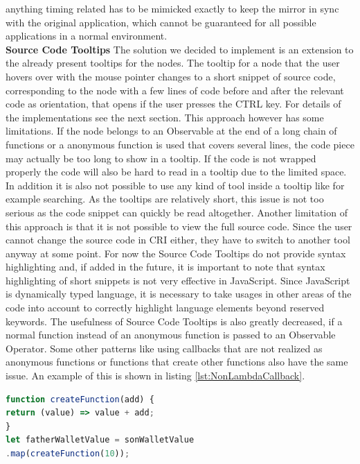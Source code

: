 anything timing related has to be mimicked exactly to keep the mirror in sync with the original application, which cannot be guaranteed for all possible applications in a normal environment. \\
\textbf{Source Code Tooltips}
The solution we decided to implement is an extension to the already present tooltips for the nodes. The tooltip for a node that the user hovers over with the mouse pointer changes to a short snippet of source code, corresponding to the node with a few lines of code before and after the relevant code as orientation, that opens if the user presses the CTRL key. For details of the implementations see the next section. This approach however has some limitations. If the node belongs to an Observable at the end of a long chain of functions or a anonymous function is used that covers several lines, the code piece may actually be too long to show in a tooltip. If the code is not wrapped properly the code will also be hard to read in a tooltip due to the limited space. In addition it is also not possible to use any kind of tool inside a tooltip like for example searching. As the tooltips are relatively short, this issue is not too serious as the code snippet can quickly be read altogether. Another limitation of this approach is that it is not possible to view the full source code. Since the user cannot change the source code in CRI either, they have to switch to another tool anyway at some point. For now the Source Code Tooltips do not provide syntax highlighting and, if added in the future, it is important to note that syntax highlighting of short snippets is not very effective in JavaScript. Since JavaScript is dynamically typed language, it is necessary to take usages in other areas of the code into account to correctly highlight language elements beyond reserved keywords. The usefulness of Source Code Tooltips is also greatly decreased, if a normal function instead of an anonymous function is passed to an Observable Operator. Some other patterns like using callbacks that are not realized as anonymous functions or functions that create other functions also have the same issue. An example of this is shown in listing \ref{lst:NonLambdaCallback}.

\begin{lstlisting}[language=JavaScript, caption={Example of using a creation function in RxJS.},label={lst:NonLambdaCallback}]
function createFunction(add) {
return (value) => value + add;
}
let fatherWalletValue = sonWalletValue
.map(createFunction(10));
\end{lstlisting}

